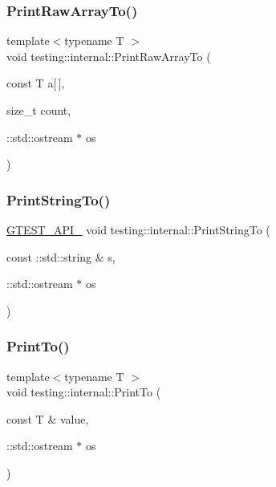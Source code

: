 \mbox{\label{namespacetesting_1_1internal_ad3013b6b4c825edee9fe18ff1d982faa}} 
\subsubsection{\texorpdfstring{Print\+Raw\+Array\+To()}{PrintRawArrayTo()}}
{\footnotesize\ttfamily template$<$typename T $>$ \\
void testing\+::internal\+::\+Print\+Raw\+Array\+To (\begin{DoxyParamCaption}\item[{const T}]{a\mbox{[}$\,$\mbox{]},  }\item[{size\+\_\+t}]{count,  }\item[{\+::std\+::ostream $\ast$}]{os }\end{DoxyParamCaption})}

\mbox{\label{namespacetesting_1_1internal_a8b53e46cea3f8bdfc9342057c4f6ba62}} 
\subsubsection{\texorpdfstring{Print\+String\+To()}{PrintStringTo()}}
{\footnotesize\ttfamily \hyperlink{gtest-port_8h_aa73be6f0ba4a7456180a94904ce17790}{G\+T\+E\+S\+T\+\_\+\+A\+P\+I\+\_\+} void testing\+::internal\+::\+Print\+String\+To (\begin{DoxyParamCaption}\item[{const \+::std\+::string \&}]{s,  }\item[{\+::std\+::ostream $\ast$}]{os }\end{DoxyParamCaption})}

\mbox{\label{namespacetesting_1_1internal_adb3c27150dbe661db0e0c4be27533460}} 
\subsubsection{\texorpdfstring{Print\+To()}{PrintTo()}\hspace{0.1cm}{\footnotesize\ttfamily [1/19]}}
{\footnotesize\ttfamily template$<$typename T $>$ \\
void testing\+::internal\+::\+Print\+To (\begin{DoxyParamCaption}\item[{const T \&}]{value,  }\item[{\+::std\+::ostream $\ast$}]{os }\end{DoxyParamCaption})}

